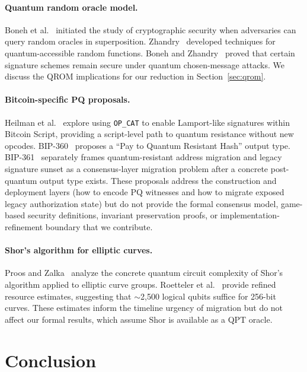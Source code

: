 \documentclass[11pt]{article}
\begin{document}
\paragraph{Quantum random oracle model.}
Boneh et al.~\cite{boneh2011random} initiated the study of cryptographic security when adversaries can query random oracles in superposition.
Zhandry~\cite{zhandry2012how} developed techniques for quantum-accessible random functions.
Boneh and Zhandry~\cite{boneh2013quantum} proved that certain signature schemes remain secure under quantum chosen-message attacks.
We discuss the QROM implications for our reduction in Section~\ref{sec:qrom}.

\paragraph{Bitcoin-specific PQ proposals.}
Heilman et al.~\cite{stewart2024great} explore using \texttt{OP\_CAT} to enable Lamport-like signatures within Bitcoin Script, providing a script-level path to quantum resistance without new opcodes.
BIP-360~\cite{bip393} proposes a ``Pay to Quantum Resistant Hash'' output type.
BIP-361~\cite{bip361} separately frames quantum-resistant address migration and legacy signature sunset as a consensus-layer migration problem after a concrete post-quantum output type exists.
These proposals address the construction and deployment layers (how to encode PQ witnesses and how to migrate exposed legacy authorization state) but do not provide the formal consensus model, game-based security definitions, invariant preservation proofs, or implementation-refinement boundary that we contribute.

\paragraph{Shor's algorithm for elliptic curves.}
Proos and Zalka~\cite{proos2003shor} analyze the concrete quantum circuit complexity of Shor's algorithm applied to elliptic curve groups.
Roetteler et al.~\cite{roetteler2017quantum} provide refined resource estimates, suggesting that $\sim$2{,}500 logical qubits suffice for 256-bit curves.
These estimates inform the timeline urgency of migration but do not affect our formal results, which assume Shor is available as a QPT oracle.

\section{Conclusion}
\end{document}
